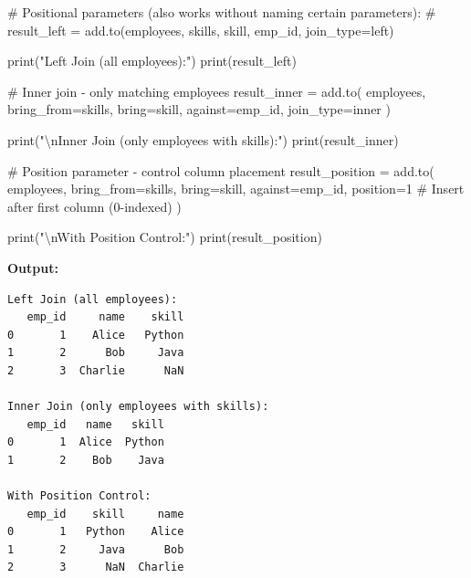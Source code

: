 \documentclass[
  letterpaper,
]{scrbook}
\newenvironment{Shaded}{\begin{snugshade}}{\end{snugshade}}
\newcommand{\BuiltInTok}[1]{\textcolor[rgb]{0.00,0.23,0.31}{#1}}
\newcommand{\CharTok}[1]{\textcolor[rgb]{0.13,0.47,0.30}{#1}}
\newcommand{\CommentTok}[1]{\textcolor[rgb]{0.37,0.37,0.37}{#1}}
\newcommand{\DecValTok}[1]{\textcolor[rgb]{0.68,0.00,0.00}{#1}}
\newcommand{\NormalTok}[1]{\textcolor[rgb]{0.00,0.23,0.31}{#1}}
\newcommand{\OperatorTok}[1]{\textcolor[rgb]{0.37,0.37,0.37}{#1}}
\newcommand{\StringTok}[1]{\textcolor[rgb]{0.13,0.47,0.30}{#1}}
\begin{document}
\begin{Shaded}
\begin{Highlighting}[]
\CommentTok{\# Positional parameters (also works without naming certain parameters):}
\CommentTok{\# result\_left = add.to(employees, skills, \textquotesingle{}skill\textquotesingle{}, \textquotesingle{}emp\_id\textquotesingle{}, join\_type=\textquotesingle{}left\textquotesingle{})}

\BuiltInTok{print}\NormalTok{(}\StringTok{"Left Join (all employees):"}\NormalTok{)}
\BuiltInTok{print}\NormalTok{(result\_left)}

\CommentTok{\# Inner join {-} only matching employees}
\NormalTok{result\_inner }\OperatorTok{=}\NormalTok{ add.to(}
\NormalTok{    employees,}
\NormalTok{    bring\_from}\OperatorTok{=}\NormalTok{skills,}
\NormalTok{    bring}\OperatorTok{=}\StringTok{\textquotesingle{}skill\textquotesingle{}}\NormalTok{,}
\NormalTok{    against}\OperatorTok{=}\StringTok{\textquotesingle{}emp\_id\textquotesingle{}}\NormalTok{,}
\NormalTok{    join\_type}\OperatorTok{=}\StringTok{\textquotesingle{}inner\textquotesingle{}}
\NormalTok{)}

\BuiltInTok{print}\NormalTok{(}\StringTok{"}\CharTok{\textbackslash{}n}\StringTok{Inner Join (only employees with skills):"}\NormalTok{)}
\BuiltInTok{print}\NormalTok{(result\_inner)}

\CommentTok{\# Position parameter {-} control column placement}
\NormalTok{result\_position }\OperatorTok{=}\NormalTok{ add.to(}
\NormalTok{    employees,}
\NormalTok{    bring\_from}\OperatorTok{=}\NormalTok{skills,}
\NormalTok{    bring}\OperatorTok{=}\StringTok{\textquotesingle{}skill\textquotesingle{}}\NormalTok{,}
\NormalTok{    against}\OperatorTok{=}\StringTok{\textquotesingle{}emp\_id\textquotesingle{}}\NormalTok{,}
\NormalTok{    position}\OperatorTok{=}\DecValTok{1}  \CommentTok{\# Insert after first column (0{-}indexed)}
\NormalTok{)}

\BuiltInTok{print}\NormalTok{(}\StringTok{"}\CharTok{\textbackslash{}n}\StringTok{With Position Control:"}\NormalTok{)}
\BuiltInTok{print}\NormalTok{(result\_position)}
\end{Highlighting}
\end{Shaded}

\textbf{Output:}

\begin{verbatim}
Left Join (all employees):
   emp_id     name    skill
0       1    Alice   Python
1       2      Bob     Java
2       3  Charlie      NaN

Inner Join (only employees with skills):
   emp_id   name   skill
0       1  Alice  Python
1       2    Bob    Java

With Position Control:
   emp_id    skill     name
0       1   Python    Alice
1       2     Java      Bob
2       3      NaN  Charlie
\end{verbatim}
\end{document}
